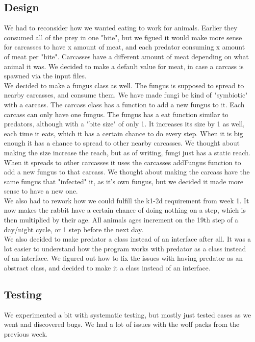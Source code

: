 \documentclass[11pt]{article}
\begin{document}
    \subsection*{Design}
    We had to reconsider how we wanted eating to work for animals. Earlier they consumed all of the prey in one "bite", but we figued it would 
    make more sense for carcasses to have x amount of meat, and each predator consuming x amount of meat per "bite". Carcasses have a different 
    amount of meat depending on what animal it was. We decided to make a default value for meat, in case a carcass is spawned via the input files. 
    \\
    We decided to make a fungus class as well. The fungus is supposed to spread to nearby carcasses, and consume them. 
    We have made fungi be kind of "symbiotic" with a carcass. The carcass class has a function to add a new fungus to it. Each carcass can only 
    have one fungus. The fungus has a eat function similar to predators, although with a "bite size" of only 1. It increases its size 
    by 1 as well, each time it eats, which it has a certain chance to do every step. When it is big enough it has a chance to spread to 
    other nearby carcasses. We thought about making the size increase the reach, but as of writing, fungi just has a static reach. 
    When it spreads to other carcasses it uses the carcasses addFungus function to add a new fungus to that carcass. 
    We thought about making the carcass have the same fungus that "infected" it, as it's own fungus, but we decided it made more 
    sense to have a new one. 
    \\
    We also had to rework how we could fulfill the k1-2d requirement from week 1. It now makes the rabbit have a certain chance of 
    doing nothing on a step, which is then multiplied by their age. 
    All animals ages increment on the 19th step of a day/night cycle, or 1 step before the next day. 
    \\
    We also decided to make predator a class instead of an interface after all. It was a lot easier to understand how the program works 
    with predator as a class instead of an interface. We figured out how to fix the issues with having predator as an abstract class, 
    and decided to make it a class instead of an interface. 
    \subsection*{Testing}
    We experimented a bit with systematic testing, but mostly just tested cases as we went and discovered bugs. 
    We had a lot of issues with the wolf packs from the previous week. 
\end{document}
